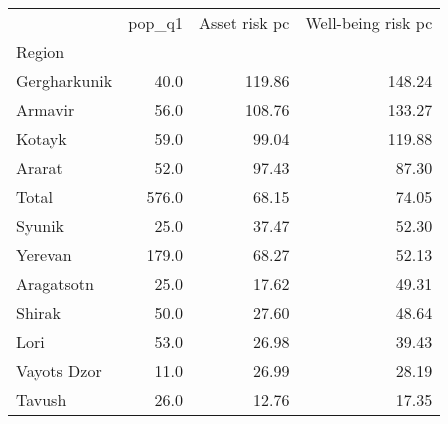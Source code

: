 \begin{tabular}{lrrr}
\toprule
{} &  pop\_q1 &  Asset risk pc &  Well-being risk pc \\
Region       &         &                &                     \\
\midrule
Gergharkunik &    40.0 &         119.86 &              148.24 \\
Armavir      &    56.0 &         108.76 &              133.27 \\
Kotayk       &    59.0 &          99.04 &              119.88 \\
Ararat       &    52.0 &          97.43 &               87.30 \\
Total        &   576.0 &          68.15 &               74.05 \\
Syunik       &    25.0 &          37.47 &               52.30 \\
Yerevan      &   179.0 &          68.27 &               52.13 \\
Aragatsotn   &    25.0 &          17.62 &               49.31 \\
Shirak       &    50.0 &          27.60 &               48.64 \\
Lori         &    53.0 &          26.98 &               39.43 \\
Vayots Dzor  &    11.0 &          26.99 &               28.19 \\
Tavush       &    26.0 &          12.76 &               17.35 \\
\bottomrule
\end{tabular}
